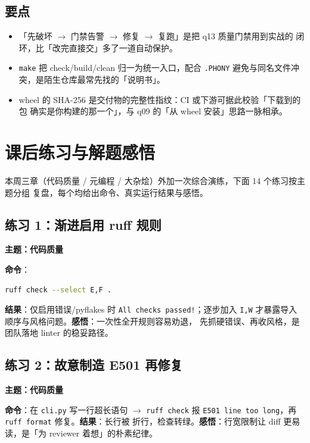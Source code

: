\documentclass{hamesome-report}
\begin{document}
\subsection{要点}
\begin{itemize}
\item 「先破坏 $\to$ 门禁告警 $\to$ 修复 $\to$ 复跑」是把 q13 质量门禁用到实战的
闭环，比「改完直接交」多了一道自动保护。
\item \texttt{make} 把 check/build/clean 归一为统一入口，配合 \texttt{.PHONY}
避免与同名文件冲突，是陌生仓库最常先找的「说明书」。
\item wheel 的 SHA-256 是交付物的完整性指纹：CI 或下游可据此校验「下载到的包
确实是你构建的那一个」，与 q09 的「从 wheel 安装」思路一脉相承。
\end{itemize}

\section{课后练习与解题感悟}
本周三章（代码质量 / 元编程 / 大杂烩）外加一次综合演练，下面 14 个练习按主题分组
复盘，每个均给出命令、真实运行结果与感悟。

\subsection{练习 1：渐进启用 ruff 规则}
\textbf{主题：代码质量}\par
\textbf{命令}：
\begin{lstlisting}[language=bash]
ruff check --select E,F .
\end{lstlisting}
\textbf{结果}：仅启用错误/pyflakes 时 \texttt{All checks passed!}；逐步加入
\texttt{I,W} 才暴露导入顺序与风格问题。\textbf{感悟}：一次性全开规则容易劝退，
先抓硬错误、再收风格，是团队落地 linter 的稳妥路径。

\subsection{练习 2：故意制造 E501 再修复}
\textbf{主题：代码质量}\par
\textbf{命令}：在 \texttt{cli.py} 写一行超长语句 $\to$ \texttt{ruff\ check} 报
\texttt{E501 line too long}，再 \texttt{ruff\ format} 修复。\textbf{结果}：长行被
折行，检查转绿。\textbf{感悟}：行宽限制让 diff 更易读，是「为 reviewer 着想」的朴素纪律。
\end{document}
